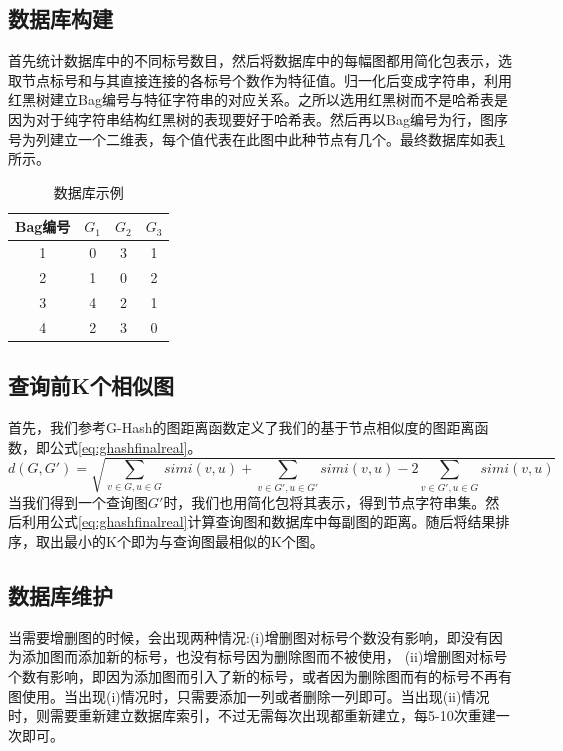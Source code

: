 \documentclass{XDBAthesis}
\begin{document}
\subsection{数据库构建}
首先统计数据库中的不同标号数目，然后将数据库中的每幅图都用简化包表示，选取节点标号和与其直接连接的各标号个数作为特征值。归一化后变成字符串，利用红黑树建立Bag编号与特征字符串的对应关系。之所以选用红黑树而不是哈希表是因为对于纯字符串结构红黑树的表现要好于哈希表。然后再以Bag编号为行，图序号为列建立一个二维表，每个值代表在此图中此种节点有几个。最终数据库如表\ref{tb:ghashdatabase}所示。
%
%    
\begin{table}[htb]
    \centering
    \begin{tabular}{|c|c|c|c|}
    \hline
        Bag编号 & $G_1 $ & $G_2 $ & $G_3 $ \\\hline
        1 & 0 & 3 & 1 \\\hline
        2 & 1 & 0 & 2 \\\hline
        3 & 4 & 2 & 1 \\\hline
        4 & 2 & 3 & 0 \\\hline
    \end{tabular}
    \caption{数据库示例}
    \label{tb:ghashdatabase}
\end{table}
\subsection{查询前K个相似图}
首先，我们参考G-Hash的图距离函数定义了我们的基于节点相似度的图距离函数，即公式\eqref{eq:ghashfinalreal}。
\begin{equation}
     d(G,G')=\sqrt{\sum_{v\in G,u\in G}simi(v,u)+\sum_{v\in G',u\in G'}simi(v,u) -2\sum_{v\in G',u\in G}simi(v,u)}
     \label{eq:ghashfinalreal}
\end{equation}
当我们得到一个查询图$G'$时，我们也用简化包将其表示，得到节点字符串集。然后利用公式\eqref{eq:ghashfinalreal}计算查询图和数据库中每副图的距离。随后将结果排序，取出最小的K个即为与查询图最相似的K个图。

\subsection{数据库维护}
当需要增删图的时候，会出现两种情况:(i)增删图对标号个数没有影响，即没有因为添加图而添加新的标号，也没有标号因为删除图而不被使用， (ii)增删图对标号个数有影响，即因为添加图而引入了新的标号，或者因为删除图而有的标号不再有图使用。当出现(i)情况时，只需要添加一列或者删除一列即可。当出现(ii)情况时，则需要重新建立数据库索引，不过无需每次出现都重新建立，每5-10次重建一次即可。
\end{document}

